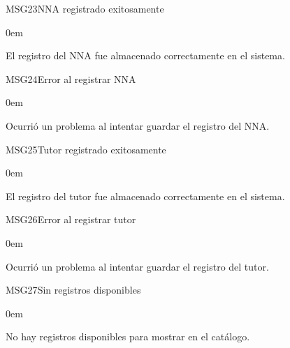 \begin{cdtMessage}[msgInfoColor]{MSG23}{NNA registrado exitosamente}
	\begin{description}\itemsep0em
		\item[Descripción:] El registro del NNA fue almacenado correctamente en el sistema.
	\end{description}
\end{cdtMessage}

\begin{cdtMessage}[msgErrorColor]{MSG24}{Error al registrar NNA}
	\begin{description}\itemsep0em
		\item[Descripción:] Ocurrió un problema al intentar guardar el registro del NNA.
	\end{description}
\end{cdtMessage}

\begin{cdtMessage}[msgInfoColor]{MSG25}{Tutor registrado exitosamente}
	\begin{description}\itemsep0em
		\item[Descripción:] El registro del tutor fue almacenado correctamente en el sistema.
	\end{description}
\end{cdtMessage}

\begin{cdtMessage}[msgErrorColor]{MSG26}{Error al registrar tutor}
	\begin{description}\itemsep0em
		\item[Descripción:] Ocurrió un problema al intentar guardar el registro del tutor.
	\end{description}
\end{cdtMessage}

\begin{cdtMessage}[msgWarningColor]{MSG27}{Sin registros disponibles}
	\begin{description}\itemsep0em
		\item[Descripción:] No hay registros disponibles para mostrar en el catálogo.
	\end{description}
\end{cdtMessage}